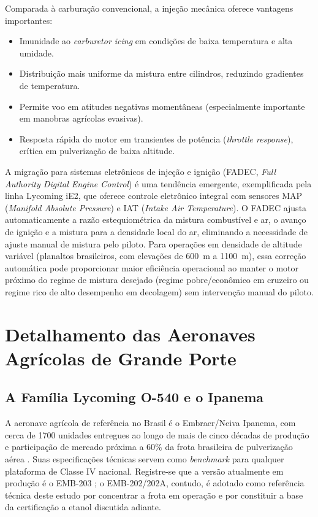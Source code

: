 \documentclass[a4paper,12pt]{article}
\begin{document}
Comparada à carburação convencional, a injeção mecânica oferece vantagens importantes:

\begin{itemize}
    \item Imunidade ao \textit{carburetor icing} em condições de baixa temperatura e alta umidade.
    \item Distribuição mais uniforme da mistura entre cilindros, reduzindo gradientes de temperatura.
    \item Permite voo em atitudes negativas momentâneas (especialmente importante em manobras agrícolas evasivas).
    \item Resposta rápida do motor em transientes de potência (\textit{throttle response}), crítica em pulverização de baixa altitude.
\end{itemize}

A migração para sistemas eletrônicos de injeção e ignição (FADEC, \textit{Full Authority Digital Engine Control}) é uma tendência emergente, exemplificada pela linha Lycoming iE2, que oferece controle eletrônico integral com sensores MAP (\textit{Manifold Absolute Pressure}) e IAT (\textit{Intake Air Temperature}). O FADEC ajusta automaticamente a razão estequiométrica da mistura combustível e ar, o avanço de ignição e a mistura para a densidade local do ar, eliminando a necessidade de ajuste manual de mistura pelo piloto. Para operações em densidade de altitude variável (planaltos brasileiros, com elevações de \SI{600}{m} a \SI{1100}{m}), essa correção automática pode proporcionar maior eficiência operacional ao manter o motor próximo do regime de mistura desejado (regime pobre/econômico em cruzeiro ou regime rico de alto desempenho em decolagem) sem intervenção manual do piloto.



\section{Detalhamento das Aeronaves Agrícolas de Grande Porte}
\label{sec:classe4}

\subsection{A Família Lycoming O-540 e o Ipanema}

A aeronave agrícola de referência no Brasil é o Embraer/Neiva Ipanema, com cerca de \num{1700} unidades entregues ao longo de mais de cinco décadas de produção e participação de mercado próxima a 60\% da frota brasileira de pulverização aérea \cite{embraer_1700}. Suas especificações técnicas servem como \textit{benchmark} para qualquer plataforma de Classe IV nacional. Registre-se que a versão atualmente em produção é o EMB-203 \cite{embraer_1700}; o EMB-202/202A, contudo, é adotado como referência técnica deste estudo por concentrar a frota em operação e por constituir a base da certificação a etanol discutida adiante.
\end{document}
